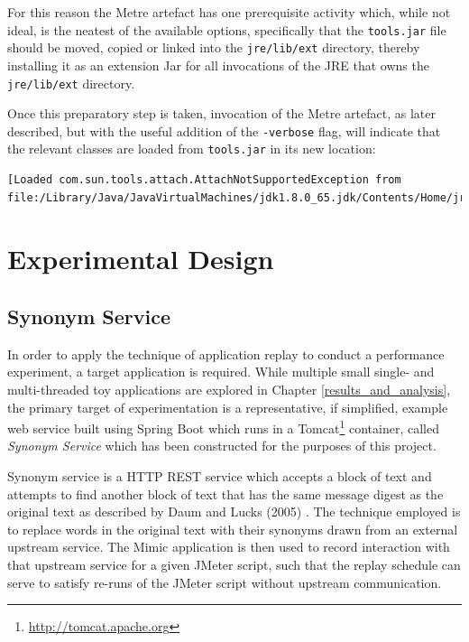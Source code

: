 \documentclass[]{final_report}
\begin{document}
For this reason the Metre artefact has one prerequisite activity which, while not ideal, is the neatest of the available options, specifically that the \lstinline{tools.jar}\noop{} file should be moved, copied or linked into the \lstinline{jre/lib/ext} directory, thereby installing it as an extension Jar for all invocations of the JRE that owns the \lstinline{jre/lib/ext} directory.\cite{extensions:2016}

Once this preparatory step is taken, invocation of the Metre artefact, as later described, but with the useful addition of the \lstinline{-verbose}\noop{} flag, will indicate that the relevant classes are loaded from \lstinline{tools.jar}\noop{} in its new location:

\begin{lstlisting}
[Loaded com.sun.tools.attach.AttachNotSupportedException from file:/Library/Java/JavaVirtualMachines/jdk1.8.0_65.jdk/Contents/Home/jre/lib/ext/tools.jar]
\end{lstlisting}

\chapter{Experimental Design \label{experimental_design}}
\section{Synonym Service \label{synonym_service}}
In order to apply the technique of application replay to conduct a performance experiment, a target application is required. While multiple small single- and multi-threaded toy applications are explored in Chapter \ref{results_and_analysis}, the primary target of experimentation is a representative, if simplified, example web service built using Spring Boot which runs in a Tomcat\footnote{\url{http://tomcat.apache.org}} container, called \textit{Synonym Service} which has been constructed for the purposes of this project.

Synonym service is a HTTP REST service which accepts a block of text and attempts to find another block of text that has the same message digest as the original text as described by Daum and Lucks (2005) \cite{daum:2005}. The technique employed is to replace words in the original text with their synonyms drawn from an external upstream service. The Mimic application is then used to record interaction with that upstream service for a given JMeter script, such that the replay schedule can serve to satisfy re-runs of the JMeter script without upstream communication.
\end{document}

